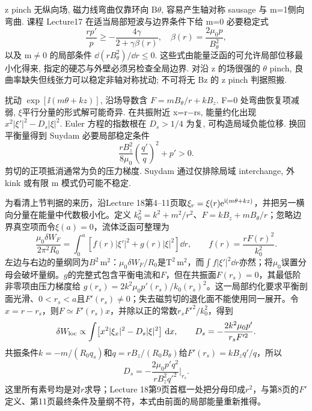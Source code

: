 \label{ch:pinchstable}
z pinch 无纵向场, 磁力线弯曲仅靠环向 B\ensuremath{\theta}, 容易产生轴对称 sausage 与 m=1侧向弯曲. 课程 Lecture17 在适当局部短波与边界条件下给 m=0 必要稳定式
\begin{equation}
 \frac{r p'}p\ge-\frac{4\gamma}{2+\gamma\beta(r)},\quad
 \beta(r)=\frac{2\mu_0p}{B_\theta^2},
\end{equation}
以及 m\ensuremath{\ne}0 的局部条件 $\dd(rB_\theta^2)/\dd r\le0$. 这些式由能量泛函的可允许局部位移最小化得来, 指定的硬芯与外壁必须另检查全局边界. 对沿 z 的场很强的 \ensuremath{\theta} pinch, 良曲率缺失但线张力可以稳定非轴对称扰动; 不可将无 Bz 的 z pinch 判据照搬.

扰动 $\exp[\ii(m\theta+kz)]$, 沿场导数含 $F=mB_\theta/r+kB_z$. F=0 处弯曲恢复项减弱, \ensuremath{\xi}平行分量的形式解可能奇异. 在共振附近 x=r\ensuremath{-}rs, 能量约化出现 $x^2|\xi'|^2-D_s|\xi|^2$. Euler 方程的指数根在 $D_s>1/4$ 为复, 可构造局域负能位移. 换回平衡量得到 Suydam 必要局部稳定条件
\begin{equation}
 \frac{rB_z^2}{8\mu_0}\left(\frac{q'}q\right)^2+p'>0.
\end{equation}
剪切的正项抵消通常为负的压力梯度. Suydam 通过仅排除局域 interchange, 外 kink 或有限 m 模式仍可能不稳定.

为看清上节判据的来历，沿Lecture 18第4--11页取$\xi_r=\xi(r)\mathrm e^{\mathrm i(m\theta+kz)}$，并把另一横向分量在能量中代数极小化。定义
$k_0^2=k^2+m^2/r^2$、$F=kB_z+mB_\theta/r$；忽略边界真空项而令$\xi(a)=0$，流体泛函可整理为
\begin{equation}
\frac{\mu_0\delta W_F}{2\pi^2R_0}
=\int_0^a\!\left[f(r)|\xi'|^2+g(r)|\xi|^2\right]\dd r,
\qquad f(r)=\frac{rF(r)^2}{k_0^2}.
\end{equation}
左边与右边的量纲同为$B^2\,\mathrm m^2$：$\mu_0\delta W_F/R_0$是$\mathrm T^2\,\mathrm m^2$，而$\int f|\xi'|^2\dd r$亦然；将$\mu_0$误置分母会破坏量纲。$g$的完整式包含平衡电流和$F$，但在共振面$F(r_s)=0$，其最低阶非零项由压力梯度给
$g(r_s)=2k^2\mu_0p'(r_s)/k_0(r_s)^2$。这一局部约化要求平衡剖面光滑、$0<r_s<a$且$F'(r_s)\ne0$；失去磁剪切的退化面不能使用同一展开。令$x=r-r_s$，则$F\simeq F'(r_s)x$，并除以正的常数$r_sF'^2/k_0^2$，得到
\begin{equation}
\delta W_{\rm loc}\propto\int\!\left[x^2|\xi_x|^2-D_s|\xi|^2\right]\,\mathrm d x,\qquad
D_s=-\frac{2k^2\mu_0p'}{r_sF'^2}.
\end{equation}
共振条件$k=-m/(R_0q_s)$和$q=rB_z/(R_0B_\theta)$给$F'(r_s)=kB_zq'/q$，所以
\begin{equation}
D_s=-\frac{2\mu_0p' q^2}{rB_z^2q'^2}\bigg|_{r_s}.
\end{equation}
这里所有素号均是对$r$求导；Lecture 18第9页首框一处把分母印成$r^2$，与第8页的$F'$定义、第11页最终条件及量纲不符，本式由前面的局部能量重新推得。

